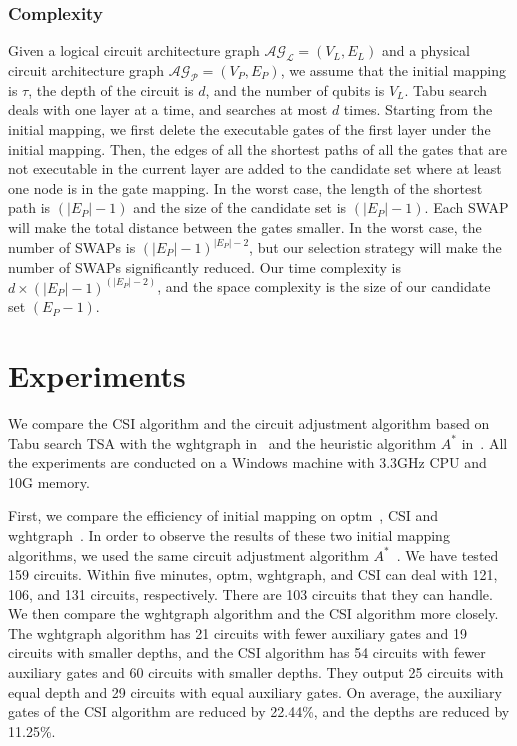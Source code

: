 \documentclass[runningheads]{llncs}
\begin{document}
\subsubsection{Complexity}
Given a logical circuit architecture graph  $\mathcal{AG_{L}}=(V_{L},E_{L})$ and a physical circuit architecture graph $\mathcal{AG_{P}}=(V_{P},E_{P})$, we assume that the initial mapping is $\tau$, the depth of the circuit is $d$, and the number of qubits is $V_{L}$. Tabu search deals with one layer at a time, and searches at most $d$ times. Starting from the initial mapping, we first delete the executable gates of the first layer under the initial mapping. Then, the edges of all the shortest paths of all the gates that are not executable in the current layer are added to the candidate set where at least one node is in the gate mapping. In the worst case, the length of the shortest path  is $(|E_{P}|-1)$
and the size of the candidate set  is $(|E_{P}|-1)$. Each SWAP will make the total distance between the gates smaller. In the worst case, the number of SWAPs is $(|E_{P}|-1)^{|E_{P}|-2}$, but our selection strategy will make the number of SWAPs significantly reduced. Our time complexity is $d\times (|E_{P}|-1)^{(|E_{P}|-2)}$, and the space complexity is the size of our candidate set $(E_{P}-1)$.
\section{Experiments}
\label{Experiment}
We compare the  CSI  algorithm 
and the circuit adjustment algorithm based on Tabu search TSA with the wghtgraph in~\cite{2020Qubit} and the heuristic algorithm $ A^{*}$  in~\cite{Zulehner2017}.
All the experiments are conducted on a Windows machine with 3.3GHz CPU and 10G memory. 
 
First, we compare the efficiency of initial mapping on optm~\cite{Zulehner2017},  CSI and wghtgraph~\cite{2020Qubit}. In order to  observe the results of these two initial mapping algorithms, we used the same circuit adjustment algorithm $A^{*}$~\cite{Zulehner2017}.
We have tested 159 circuits. Within five minutes, optm,  wghtgraph, and CSI  can deal with 121, 106, and  131 circuits, respectively. There are 103 circuits that they can handle. We then compare the wghtgraph algorithm and the CSI algorithm more closely. The wghtgraph algorithm has 21 circuits with fewer auxiliary gates  and 19 circuits with smaller depths, and the CSI algorithm has 54 circuits with fewer auxiliary gates and 60 circuits with  smaller depths. They output 25 circuits with equal depth and  29 circuits with equal auxiliary gates. On average, the auxiliary gates of the CSI algorithm are reduced by 22.44\%, 
and the depths are reduced by 11.25\%.
\end{document}
